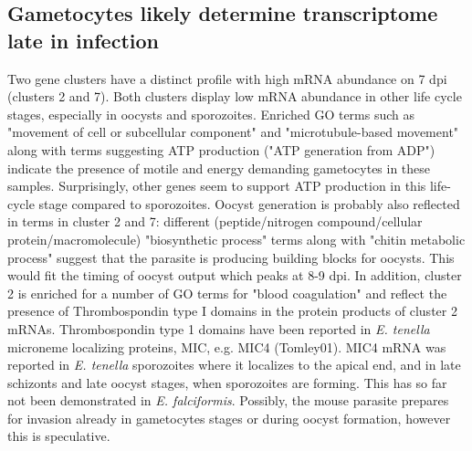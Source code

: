\documentclass{bmcart}
\begin{document}
\subsection*{Gametocytes likely determine transcriptome late in infection}
Two gene clusters have a distinct profile with high mRNA abundance on 7 dpi (clusters 2 and 7). Both clusters display low mRNA abundance in other life cycle stages, especially in oocysts and sporozoites. Enriched GO terms such as "movement of cell or subcellular component" and "microtubule-based movement" along with terms suggesting ATP production ("ATP generation from ADP") indicate the presence of motile and energy demanding gametocytes in these samples. Surprisingly, other genes seem to support ATP production in this life-cycle stage compared to sporozoites. Oocyst generation is probably also reflected in terms in cluster 2 and 7: different (peptide/nitrogen compound/cellular protein/macromolecule) "biosynthetic process" terms along with "chitin metabolic process" suggest that the parasite is producing building blocks for oocysts. This would fit the timing of oocyst output which peaks at 8-9 dpi. 
In addition, cluster 2 is enriched for a number of GO terms for "blood coagulation" and reflect the presence of Thrombospondin type I domains in the protein products of cluster 2 mRNAs. Thrombospondin type 1 domains have been reported in \textit{E. tenella} microneme localizing proteins, MIC, e.g. MIC4 (Tomley01). MIC4 mRNA was reported in \textit{E. tenella} sporozoites where it localizes to the apical end, and in late schizonts and late oocyst stages, when sporozoites are forming. This has so far not been demonstrated in \textit{E. falciformis}. Possibly, the mouse parasite prepares for invasion already in gametocytes stages or during oocyst formation, however this is speculative.
\end{document}
